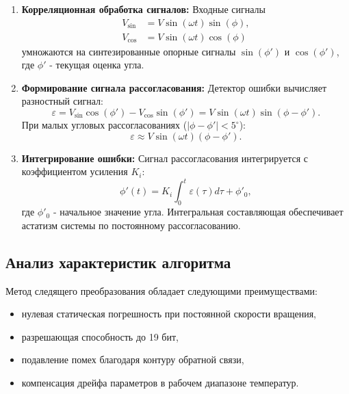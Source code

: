 \begin{enumerate}
    \item \textbf{Корреляционная обработка сигналов:}
    Входные сигналы 
    \begin{align*}
        V_{\sin} &= V \sin(\omega t) \sin(\phi), \\
        V_{\cos} &= V \sin(\omega t) \cos(\phi)
    \end{align*}
    умножаются на синтезированные 
    опорные сигналы $\sin(\phi')$ и $\cos(\phi')$, где $\phi'$ - текущая оценка угла.
    
    \item \textbf{Формирование сигнала рассогласования:}
    Детектор ошибки вычисляет разностный сигнал:
    \begin{equation}
        \varepsilon = V_{\sin} \cos(\phi') - V_{\cos} \sin(\phi') = V \sin(\omega t) \sin(\phi - \phi').
        \label{eq:error}
    \end{equation}
    При малых угловых рассогласованиях ($|\phi - \phi'| < 5^\circ$):
    \begin{equation}
        \varepsilon \approx V \sin(\omega t) (\phi - \phi').
        \label{eq:error_approx}
    \end{equation}
    
    \item \textbf{Интегрирование ошибки:}
    Сигнал рассогласования интегрируется с коэффициентом усиления $K_i$:
    \begin{equation}
        \phi'(t) = K_i \int_0^t \varepsilon(\tau) d\tau + \phi'_0,
        \label{eq:integration}
    \end{equation}
    где $\phi'_0$ - начальное значение угла. Интегральная составляющая обеспечивает астатизм системы по постоянному рассогласованию.
\end{enumerate}

\subsection{Анализ характеристик алгоритма}
Метод следящего преобразования обладает следующими преимуществами:
\begin{itemize}
    \item нулевая статическая погрешность при постоянной скорости вращения,
    \item разрешающая способность до 19 бит,
    \item подавление помех благодаря контуру обратной связи,
    \item компенсация дрейфа параметров в рабочем диапазоне температур.
\end{itemize}

